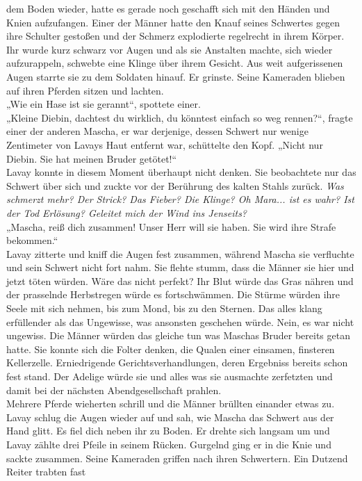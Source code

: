 dem Boden wieder, hatte es gerade noch geschafft sich mit den Händen und Knien aufzufangen. Einer 
der Männer hatte den Knauf seines Schwertes gegen ihre Schulter gestoßen und der Schmerz 
explodierte regelrecht in ihrem Körper. Ihr wurde kurz schwarz vor Augen und als sie Anstalten 
machte, sich wieder aufzurappeln, schwebte eine Klinge über ihrem Gesicht. Aus weit aufgerissenen 
Augen starrte sie zu dem Soldaten hinauf. Er grinste. Seine Kameraden blieben auf ihren Pferden 
sitzen und lachten. \\
„Wie ein Hase ist sie gerannt“, spottete einer. \\
„Kleine Diebin, dachtest du wirklich, du könntest einfach so weg rennen?“, fragte einer der anderen
Mascha, er war derjenige, dessen Schwert nur wenige Zentimeter von Lavays Haut entfernt war, 
schüttelte den Kopf. „Nicht nur Diebin. Sie hat meinen Bruder getötet!“\\
Lavay konnte in diesem Moment überhaupt nicht denken. Sie beobachtete nur das Schwert über sich und 
zuckte vor der Berührung des kalten Stahls zurück. \textit{Was schmerzt mehr? Der Strick? Das 
Fieber? Die Klinge? Oh Mara... ist es wahr? Ist der Tod Erlösung? Geleitet mich der Wind ins 
Jenseits?}\\
„Mascha, reiß dich zusammen! Unser Herr will sie haben. Sie wird ihre Strafe bekommen.“\\
Lavay zitterte und kniff die Augen fest zusammen, während Mascha sie verfluchte und sein Schwert 
nicht fort nahm. Sie flehte stumm, dass die Männer sie hier und jetzt töten würden. Wäre das nicht 
perfekt? Ihr Blut würde das Gras nähren und der prasselnde Herbstregen würde es fortschwämmen. Die 
Stürme würden ihre Seele mit sich nehmen, bis zum Mond, bis zu den Sternen. Das alles klang 
erfüllender als das Ungewisse, was ansonsten geschehen würde. Nein, es war nicht ungewiss. Die 
Männer würden das gleiche tun was Maschas Bruder bereits getan hatte. Sie konnte sich die Folter 
denken, die Qualen einer einsamen, finsteren Kellerzelle. Erniedrigende Gerichtsverhandlungen, 
deren Ergebniss bereits schon fest stand. Der Adelige würde sie und alles was sie ausmachte 
zerfetzten und damit bei der nächsten Abendgesellschaft prahlen.\\
Mehrere Pferde wieherten schrill und die Männer brüllten einander etwas zu. Lavay schlug die Augen 
wieder auf und sah, wie Mascha das Schwert aus der Hand glitt. Es fiel dich neben ihr zu Boden. Er 
drehte sich langsam um und Lavay zählte drei Pfeile in seinem Rücken. Gurgelnd ging er in die Knie 
und sackte zusammen. Seine Kameraden griffen nach ihren Schwertern. Ein Dutzend Reiter trabten fast 
